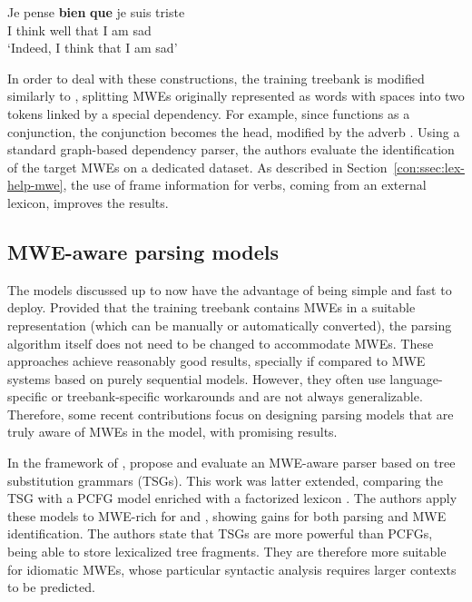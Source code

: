 \documentclass[output=paper]{langsci/langscibook}
\begin{document}
\ea
\gll Je pense {\textbf{bien}} {\textbf{que}}  je suis triste\\  
     I  think well       that       I  am   sad\\
\glt `Indeed, I think that I am sad'
\z

In order to deal with these constructions, the training treebank is modified similarly to \citet{candito2014strategies}, splitting MWEs originally represented as words with spaces into two tokens linked by a special dependency. 
For example, since  functions as a conjunction, the conjunction  becomes the head, modified by the adverb . %
Using a standard graph-based dependency parser, the authors evaluate the identification of the target MWEs on a dedicated dataset. As described in Section~\ref{con:ssec:lex-help-mwe}, the use of  frame information for verbs, coming from an external lexicon, improves the results.


\subsection{MWE-aware parsing models}
\label{con:ssec:joint:model}

The models discussed up to now have the advantage of being simple and fast to deploy.
Provided that the training treebank contains MWEs in a suitable representation (which can be manually or automatically converted), the parsing algorithm itself does not need to be changed to accommodate MWEs.
These approaches achieve reasonably good results, specially if compared to MWE systems based on purely sequential models.
However, they often use language-specific or treebank-specific workarounds and are not always generalizable.
Therefore, some recent contributions focus on designing parsing models that are truly awa\-re of MWEs in the model, with promising results.

In the framework of , \citet{green11} propose and evaluate an MWE-aware parser based on tree substitution grammars (TSGs).
This work was latter extended, comparing the TSG with a PCFG model enriched with a factorized lexicon \citep{green13}.
The authors apply these models to MWE-rich  for  and , showing gains for both parsing and MWE identification.
The authors state that TSGs are more powerful than PCFGs, being able to store lexicalized tree fragments.
They are therefore more suitable for idiomatic MWEs, whose particular syntactic analysis requires larger contexts to be predicted.
\end{document}
